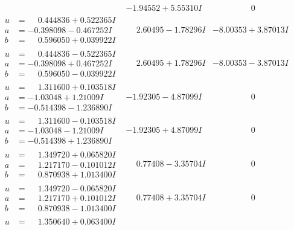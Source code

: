 \documentclass[1p]{elsarticle_modified}
\theoremstyle{definition}
\begin{document}
$$\begin{array}{c|c|c}
 & -1.94552 + 5.55310 I & \phantom{-0.000000 } 0 \\ \hline\begin{aligned}
u &= \phantom{-}0.444836 + 0.522365 I \\
a &= -0.398098 - 0.467252 I \\
b &= \phantom{-}0.596050 + 0.039922 I\end{aligned}
 & \phantom{-}2.60495 - 1.78296 I & -8.00353 + 3.87013 I \\ \hline\begin{aligned}
u &= \phantom{-}0.444836 - 0.522365 I \\
a &= -0.398098 + 0.467252 I \\
b &= \phantom{-}0.596050 - 0.039922 I\end{aligned}
 & \phantom{-}2.60495 + 1.78296 I & -8.00353 - 3.87013 I \\ \hline\begin{aligned}
u &= \phantom{-}1.311600 + 0.103518 I \\
a &= -1.03048 + 1.21009 I \\
b &= -0.514398 - 1.236890 I\end{aligned}
 & -1.92305 - 4.87099 I & \phantom{-0.000000 } 0 \\ \hline\begin{aligned}
u &= \phantom{-}1.311600 - 0.103518 I \\
a &= -1.03048 - 1.21009 I \\
b &= -0.514398 + 1.236890 I\end{aligned}
 & -1.92305 + 4.87099 I & \phantom{-0.000000 } 0 \\ \hline\begin{aligned}
u &= \phantom{-}1.349720 + 0.065820 I \\
a &= \phantom{-}1.217170 - 0.101012 I \\
b &= \phantom{-}0.870938 + 1.013400 I\end{aligned}
 & \phantom{-}0.77408 - 3.35704 I & \phantom{-0.000000 } 0 \\ \hline\begin{aligned}
u &= \phantom{-}1.349720 - 0.065820 I \\
a &= \phantom{-}1.217170 + 0.101012 I \\
b &= \phantom{-}0.870938 - 1.013400 I\end{aligned}
 & \phantom{-}0.77408 + 3.35704 I & \phantom{-0.000000 } 0 \\ \hline\begin{aligned}
u &= \phantom{-}1.350640 + 0.063400 I \\

\end{aligned}
\end{array}$$
\end{document}
